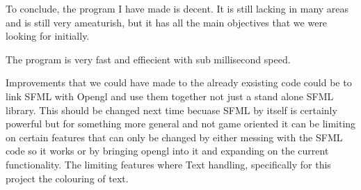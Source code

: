 To conclude, the program I have made is decent. It is still lacking in many areas and is still very ameaturish, but it has all the main objectives that we were looking for initially.

The program is very fast and effiecient with sub millisecond speed.

Improvements that we could have made to the already exsisting code could be to link SFML with Opengl and use them together not just a stand alone SFML library. This should be changed next time becuase SFML by itself is certainly powerful but for something more general and not game oriented it can be limiting on certain features that can only be changed by either messing with the SFML code so it works or by bringing opengl into it and expanding on the current functionality. The limiting features where Text handling, specifically for this project the colouring of text. 